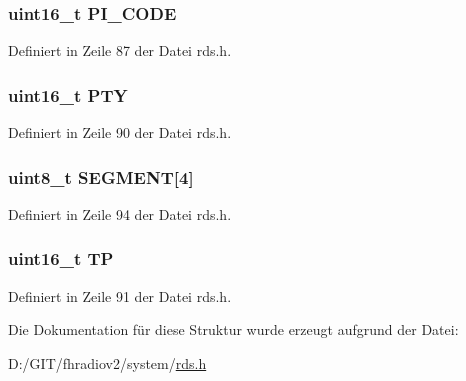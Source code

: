 \subsubsection[{P\+I\+\_\+\+C\+O\+D\+E}]{\setlength{\rightskip}{0pt plus 5cm}uint16\+\_\+t P\+I\+\_\+\+C\+O\+D\+E}\label{structgroup__2a_a5cd9b1f6413028425796c1129aa8fd87}


Definiert in Zeile 87 der Datei rds.\+h.

\hypertarget{structgroup__2a_a0474967478fbbc2c71b800d2e0132d45}{}
\subsubsection[{P\+T\+Y}]{\setlength{\rightskip}{0pt plus 5cm}uint16\+\_\+t P\+T\+Y}\label{structgroup__2a_a0474967478fbbc2c71b800d2e0132d45}


Definiert in Zeile 90 der Datei rds.\+h.

\hypertarget{structgroup__2a_a51d200a5620dec8e6cd7a76c63d03ed1}{}
\subsubsection[{S\+E\+G\+M\+E\+N\+T}]{\setlength{\rightskip}{0pt plus 5cm}uint8\+\_\+t S\+E\+G\+M\+E\+N\+T\mbox{[}4\mbox{]}}\label{structgroup__2a_a51d200a5620dec8e6cd7a76c63d03ed1}


Definiert in Zeile 94 der Datei rds.\+h.

\hypertarget{structgroup__2a_ab9e634c63b0d95a96716d5f6d7f06d72}{}
\subsubsection[{T\+P}]{\setlength{\rightskip}{0pt plus 5cm}uint16\+\_\+t T\+P}\label{structgroup__2a_ab9e634c63b0d95a96716d5f6d7f06d72}


Definiert in Zeile 91 der Datei rds.\+h.



Die Dokumentation für diese Struktur wurde erzeugt aufgrund der Datei\+:\begin{DoxyCompactItemize}
\item 
D\+:/\+G\+I\+T/fhradiov2/system/\hyperlink{rds_8h}{rds.\+h}\end{DoxyCompactItemize}
